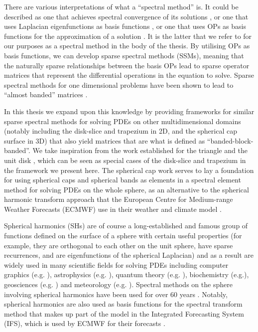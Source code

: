 There are various interpretations of what a \enquote{spectral method} is. It could be described as one that achieves spectral convergence of its solutions \cite{gottlieb1977numerical}, or one that uses Laplacian eigenfunctions as basis functions \cite{zhong2007numerical}, or one that uses OPs as basis functions for the approximation of a solution \cite{olver2019triangle}. It is the latter that we refer to for our purposes as a spectral method in the body of the thesis. By utilising OPs as basis functions, we can develop sparse spectral methods (SSMs), meaning that the naturally sparse relationships between the basis OPs lead to sparse operator matrices that represent the differential operations in the equation to solve. Sparse spectral methods for one dimensional problems have been shown to lead to \enquote{almost banded} matrices \cite{olver2013fast}.

In this thesis we expand upon this knowledge by providing frameworks for similar sparse spectral methods for solving PDEs on other multidimensional domains (notably including the disk-slice and trapezium in 2D, and the spherical cap surface in 3D) that also yield matrices that are what is defined as \enquote{banded-block-banded}. We take inspiration from the work established for the triangle \cite{olver2019triangle} and the unit disk \cite{vasil2016tensor}, which can  be seen as special cases of the disk-slice and trapezium in the framework we present here. The spherical cap work serves to lay a foundation for using spherical caps and spherical bands as elements in a spectral element method for solving PDEs on the whole sphere, as an alternative to the spherical harmonic transform approach that the European Centre for Medium-range Weather Forecasts (ECMWF) use in their weather and climate model \cite{cheong2006dynamical}. 

Spherical harmonics (SHs) are of course a long-established and famous group of functions defined on the surface of a sphere with certain useful properties (for example, they are orthogonal to each other on the unit sphere, have sparse recurrences, and are eigenfunctions of the spherical Laplacian) and as a result are widely used in many scientific fields for solving PDEs including computer graphics (e.g. \cite{moon2008efficient, sloan2013efficient}), astrophysics (e.g. \cite{vasil2019tensor}), quantum theory (e.g. \cite{varshalovich1988quantum}), biochemistry (e.g.\cite{parimal2014application, basko1998application}), geosciences (e.g. \cite{fletcher2017data, hollerbach2013parity}) and meteorology (e.g. \cite{evans1998spherical, rubinstein2015scalar, wedi2013fast, ecmwf2020scalability, courtier1998ecmwf, silberman1954planetary, gottlieb1977numerical}). Spectral methods on the sphere involving spherical harmonics have been used for over 60 years \cite{silberman1954planetary}. Notably, spherical harmonics are also used as basis functions for the spectral transform method that makes up part of the model in the Integrated Forecasting System (IFS), which is used by ECMWF for their forecasts \cite{wedi2013fast}. 

